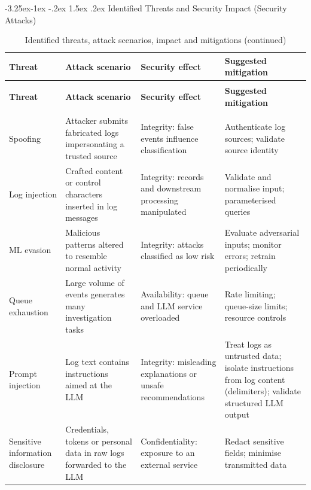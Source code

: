 \documentclass[12pt,a4paper]{report}
\makeatletter
\renewcommand{\arraystretch}{1.05}
\renewcommand\subsection{\@startsection{subsection}{2}{\z@}%
  {-3.25ex\@plus -1ex \@minus -.2ex}%
  {1.5ex \@plus .2ex}%
  {\normalfont\fontsize{12}{18}\selectfont\bfseries}}
\makeatother
\begin{document}
\subsection{Identified Threats and Security Impact (Security Attacks)}
\footnotesize
\renewcommand{\arraystretch}{1.2}
\begin{longtable}{>{\raggedright\arraybackslash}p{2.1cm} >{\raggedright\arraybackslash}p{4.2cm} >{\raggedright\arraybackslash}p{4.0cm} >{\raggedright\arraybackslash}p{5.4cm}}
\caption{Identified threats, attack scenarios, impact and mitigations}
\label{tab:threats}\\
\toprule
\textbf{Threat} & \textbf{Attack scenario} & \textbf{Security effect} & \textbf{Suggested mitigation}\\
\midrule
\endfirsthead
\caption[]{Identified threats, attack scenarios, impact and mitigations (continued)}\\
\toprule
\textbf{Threat} & \textbf{Attack scenario} & \textbf{Security effect} & \textbf{Suggested mitigation}\\
\midrule
\endhead
\midrule
\multicolumn{4}{r}{Continued on next page}\\
\endfoot
\bottomrule
\endlastfoot
Spoofing & Attacker submits fabricated logs impersonating a trusted source & Integrity: false events influence classification & Authenticate log sources; validate source identity\\
Log injection & Crafted content or control characters inserted in log messages & Integrity: records and downstream processing manipulated & Validate and normalise input; parameterised queries\\
ML evasion & Malicious patterns altered to resemble normal activity & Integrity: attacks classified as low risk & Evaluate adversarial inputs; monitor errors; retrain periodically\\
Queue exhaustion & Large volume of events generates many investigation tasks & Availability: queue and LLM service overloaded & Rate limiting; queue-size limits; resource controls\\
Prompt injection & Log text contains instructions aimed at the LLM & Integrity: misleading explanations or unsafe recommendations & Treat logs as untrusted data; isolate instructions from log content (delimiters); validate structured LLM output\\
Sensitive information disclosure & Credentials, tokens or personal data in raw logs forwarded to the LLM & Confidentiality: exposure to an external service & Redact sensitive fields; minimise transmitted data\\

\end{longtable}
\end{document}

